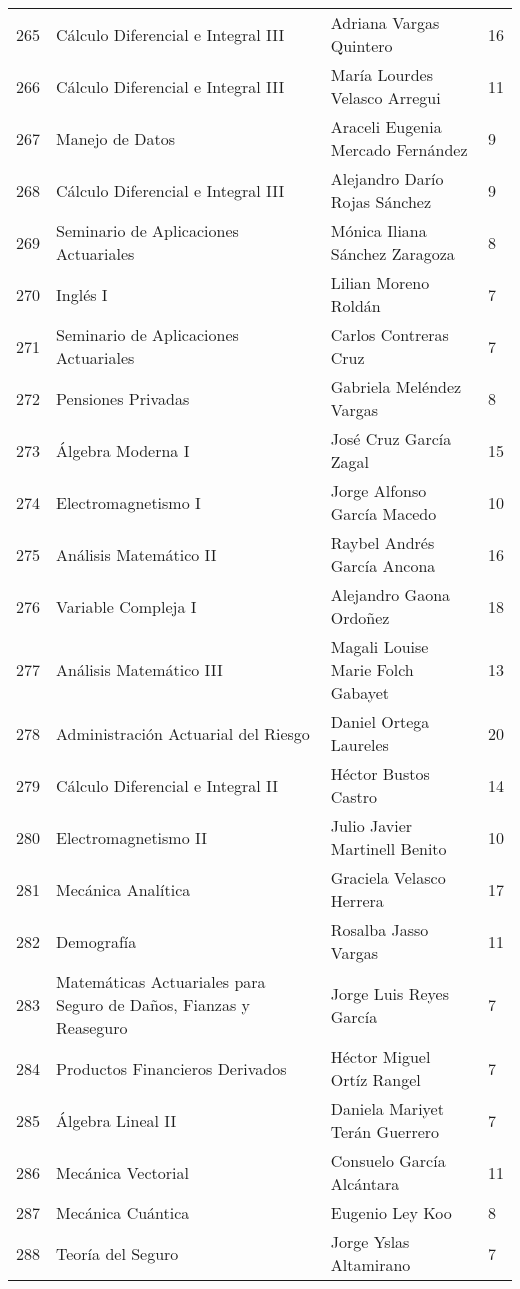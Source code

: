 \begin{table}[ht]
\begin{tabular}{rlll}
  265 & Cálculo Diferencial e Integral III & Adriana Vargas Quintero & 16 \\ 
  266 & Cálculo Diferencial e Integral III & María Lourdes Velasco Arregui & 11 \\ 
  267 & Manejo de Datos & Araceli Eugenia Mercado Fernández & 9 \\ 
  268 & Cálculo Diferencial e Integral III & Alejandro Darío Rojas Sánchez & 9 \\ 
  269 & Seminario de Aplicaciones Actuariales & Mónica Iliana Sánchez Zaragoza & 8 \\ 
  270 & Inglés I & Lilian Moreno Roldán & 7 \\ 
  271 & Seminario de Aplicaciones Actuariales & Carlos Contreras Cruz & 7 \\ 
  272 & Pensiones Privadas & Gabriela Meléndez Vargas & 8 \\ 
  273 & Álgebra Moderna I & José Cruz García Zagal & 15 \\ 
  274 & Electromagnetismo I & Jorge Alfonso García Macedo & 10 \\ 
  275 & Análisis Matemático II & Raybel Andrés García Ancona & 16 \\ 
  276 & Variable Compleja I & Alejandro Gaona Ordoñez & 18 \\ 
  277 & Análisis Matemático III & Magali Louise Marie Folch Gabayet & 13 \\ 
  278 & Administración Actuarial del Riesgo & Daniel Ortega Laureles & 20 \\ 
  279 & Cálculo Diferencial e Integral II & Héctor Bustos Castro & 14 \\ 
  280 & Electromagnetismo II & Julio Javier Martinell Benito & 10 \\ 
  281 & Mecánica Analítica & Graciela Velasco Herrera & 17 \\ 
  282 & Demografía & Rosalba Jasso Vargas & 11 \\ 
  283 & Matemáticas Actuariales para Seguro de Daños, Fianzas y Reaseguro & Jorge Luis Reyes García & 7 \\ 
  284 & Productos Financieros Derivados & Héctor Miguel Ortíz Rangel & 7 \\ 
  285 & Álgebra Lineal II & Daniela Mariyet Terán Guerrero & 7 \\ 
  286 & Mecánica Vectorial & Consuelo García Alcántara & 11 \\ 
  287 & Mecánica Cuántica & Eugenio Ley Koo & 8 \\ 
  288 & Teoría del Seguro & Jorge Yslas Altamirano & 7 \\ 

\end{tabular}
\end{table}
